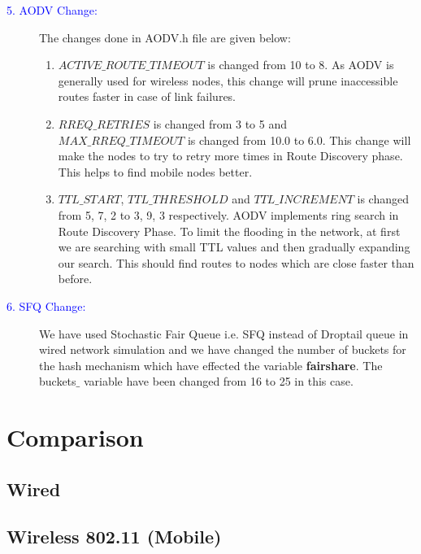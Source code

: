 \documentclass{article}[12pt]
\begin{document}
\begin{description}
    \item[\textcolor{blue}{5. AODV Change:}] The changes done in AODV.h file are given below:
        \begin{enumerate}
            \item $ACTIVE\_ROUTE\_TIMEOUT$ is changed from 10 to 8. As AODV is generally used for wireless nodes, this change will prune inaccessible routes faster in case of link failures.
            
            \item  $RREQ\_RETRIES$ is changed from 3 to 5 and $MAX\_RREQ\_TIMEOUT$ is changed from 10.0 to 6.0. This change will make the nodes to try to retry more times in Route Discovery phase. This helps to find mobile nodes better.
            
            \item $TTL\_START$, $TTL\_THRESHOLD$ and $TTL\_INCREMENT$ is changed from 5, 7, 2 to 3, 9, 3 respectively. AODV implements ring search in Route Discovery Phase. To limit the flooding in the network, at first we are searching with small TTL values and then gradually expanding our search. This should find routes to nodes which are close faster than before. 
        
        \end{enumerate}
        
    
    \item[\textcolor{blue}{6. SFQ Change:}]
        We have used Stochastic Fair Queue i.e. SFQ instead of Droptail queue in wired network simulation and we have changed the number of buckets for the hash mechanism which have effected the variable \textbf{fairshare}.
        The buckets$\_$ variable have been changed from 16 to 25 in this case. 
    
    
    \end{description}

\newpage
\section{Comparison} 
\label{sec:com}
    
    \subsection{Wired}
        
    
    \newpage
    \newpage
    \newpage
    \subsection{Wireless 802.11 (Mobile)}
        
\end{document}
